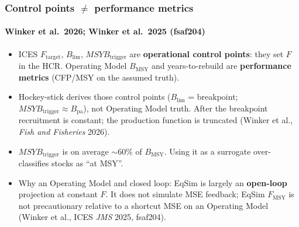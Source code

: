 \documentclass[
  aspectratio=169,
  t,
  onlytextwidth,
  10pt,
]{beamer}
\newcommand{\Fmsy}{F_{\mathrm{MSY}}}
\newcommand{\Ftar}{F_{\mathrm{target}}}
\newcommand{\Blim}{B_{\lim}}
\newcommand{\Btrig}{MSYB_{\mathrm{trigger}}}
\newcommand{\Bmsy}{B_{\mathrm{MSY}}}
\begin{document}
\begin{frame}
  \frametitle{Control points $\neq$ performance metrics}
  \framesubtitle{Winker et al.\ 2026; Winker et al.\ 2025 (fsaf204)}

  \begin{itemize}
    \item ICES $\Ftar$, $\Blim$, $\Btrig$ are \textbf{operational control
          points}: they set $F$ in the HCR. Operating Model $\Bmsy$ and years-to-rebuild
          are \textbf{performance metrics} (CFP/MSY on the assumed truth).
    \item Hockey-stick derives those control points ($\Blim$ = breakpoint;
          $\Btrig \approx B_{\mathrm{pa}}$), not Operating Model truth. After the
          breakpoint recruitment is constant; the production function is
          truncated (Winker et al., \emph{Fish and Fisheries} 2026).
    \item $\Btrig$ is on average $\sim$60\% of $\Bmsy$. Using it as a
          surrogate over-classifies stocks as ``at MSY''.
    \item Why an Operating Model and closed loop: EqSim is largely an \textbf{open-loop}
          projection at constant $F$. It does not simulate MSE feedback;
          EqSim $\Fmsy$ is not precautionary relative to a shortcut MSE
          on an Operating Model (Winker et al., ICES \emph{JMS} 2025, fsaf204).
  \end{itemize}
\end{frame}
\end{document}
